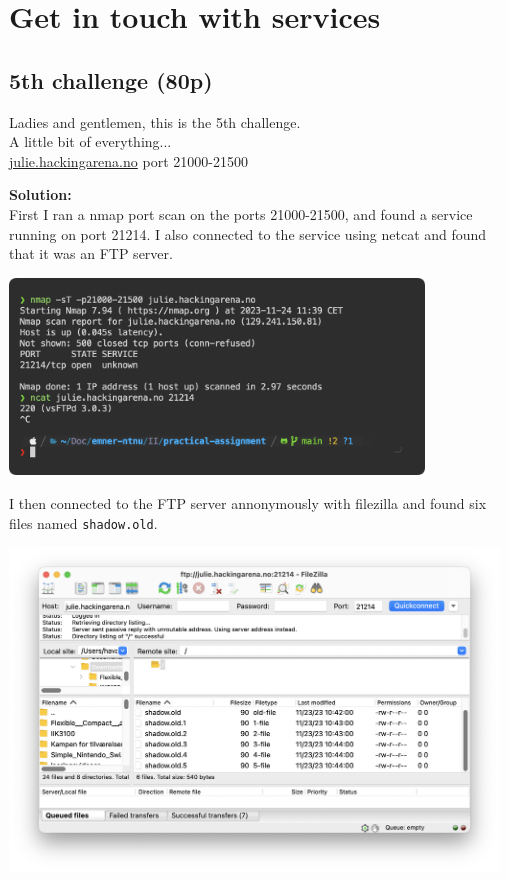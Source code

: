 \section{Get in touch with services}

\subsection{5th challenge (80p)}
\addtocounter{points}{80}
Ladies and gentlemen, this is the 5th challenge.
\\A little bit of everything...
\\\url{julie.hackingarena.no} port 21000-21500

\textbf{Solution:}\\
First I ran a nmap port scan on the ports 21000-21500, and found a service running on port 21214. I also connected to the service using netcat and found that it was an FTP server.

\begin{center}
    \includegraphics[width=11cm]{img/Get in touch with services/5th challenge/Screenshot 2023-11-24 at 14.23.03.png}
\end{center}

I then connected to the FTP server annonymously with filezilla and found six files named \texttt{shadow.old}.

\begin{center}
    \includegraphics[width=13cm]{img/Get in touch with services/5th challenge/Screenshot 2023-11-24 at 14.00.01.png}
\end{center}

